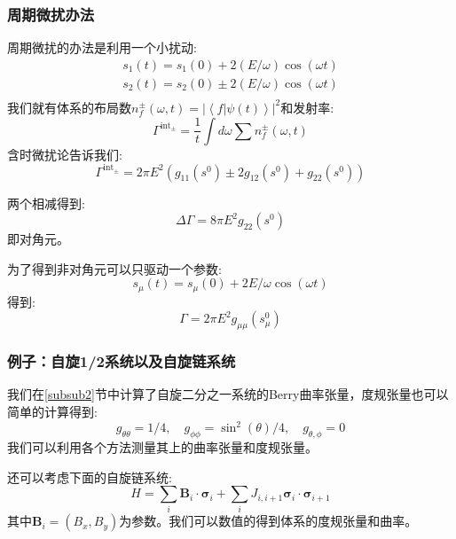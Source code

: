 \documentclass[supercite]{HustGraduPaper}
\newcommand{\bracket}[2]{\left\langle #1|#2 \right\rangle}
\begin{document}
   \subsubsection{周期微扰办法}
   周期微扰的办法是利用一个小扰动\cite{palumbo2018revealing,ozawa2018extracting,yu2018experimental}:
   \begin{equation}
   \begin{aligned}
   s_1(t) = s_1(0) + 2(E/\omega)\cos(\omega t)\\
    s_2(t) = s_2(0) \pm 2(E/\omega)\cos(\omega t)\\
   \end{aligned}
   \end{equation}
   我们就有体系的布局数$n_f^\pm(\omega,t) = |\bracket{f}{\psi(t)}|^2$和发射率:
   \begin{equation}
   \Gamma^{\text{int}_\pm} = \frac{1}{t} \int d\omega \sum n_f^\pm(\omega,t)
   \end{equation}
   含时微扰论告诉我们:
   \begin{equation}
    \Gamma^{\text{int}_\pm}  =2\pi E^2 (g_{11}(s^0) \pm 2g_{12}(s^0)+g_{22}(s^0))
   \end{equation}
   
   两个相减得到:
   \begin{equation}
   \Delta \Gamma = 8\pi E^2 g_{22}(s^0)
   \end{equation}
   即对角元。
   
   为了得到非对角元可以只驱动一个参数:
   \begin{equation}
   s_\mu(t) = s_\mu(0) + 2E/\omega \cos(\omega t)
   \end{equation}
   得到:
   \begin{equation}
   \Gamma = 2\pi E^2g_{\mu \mu}(s_\mu^0)
   \end{equation}
   
   \subsubsection{例子：自旋1/2系统以及自旋链系统}
   我们在\ref{subsub2}节中计算了自旋二分之一系统的Berry曲率张量，度规张量也可以简单的计算得到\cite{ozawa2018extracting}:
   \begin{equation}
   g_{\theta\theta} = 1/4, \quad g_{\phi\phi} = \sin^2(\theta)/4,\quad g_{\theta,\phi} = 0
   \end{equation}
   我们可以利用各个方法测量其上的曲率张量和度规张量。
   
   还可以考虑下面的自旋链系统:
   \begin{equation}
   H = \sum_i \bm{B}_i \cdot \bm{\sigma}_i+ \sum_{i} J_{i,i+1} \bm{\sigma}_i\cdot \bm{\sigma}_{i+1} 
   \end{equation}
   其中$\bm{B}_i = (B_x,B_y)$为参数。我们可以数值的得到体系的度规张量和曲率。
   
\end{document}
